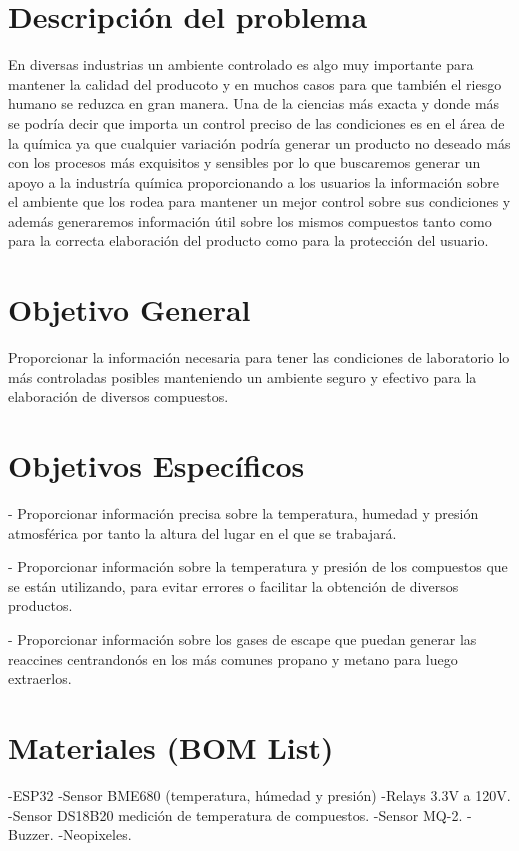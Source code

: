 \documentclass[10pt,twocolumn,letterpaper]{article}
\begin{document}
\begin{Abstract}
\section{Descripción del problema}
En diversas industrias un ambiente controlado es algo muy importante para mantener la calidad del producoto y en muchos casos para que también el riesgo humano se reduzca en gran manera. Una de la ciencias más exacta y donde más se podría decir que importa un control preciso de las condiciones es en el área de la química ya que cualquier variación podría generar un producto no deseado más con los procesos más exquisitos y sensibles por lo que buscaremos generar un apoyo a la industría química proporcionando a los usuarios la información sobre el ambiente que los rodea para mantener un mejor control sobre sus condiciones y además generaremos información útil sobre los mismos compuestos tanto como para la correcta elaboración del producto como para la protección del usuario. 

\section{Objetivo General}
Proporcionar la información necesaria para tener las condiciones de laboratorio lo más controladas posibles manteniendo un ambiente seguro y efectivo para la elaboración de diversos compuestos.

\section{Objetivos Específicos}
    - Proporcionar información precisa sobre la temperatura, humedad y presión atmosférica por tanto la altura del lugar en el que se trabajará. 

    - Proporcionar información sobre la temperatura y presión de los compuestos que se están utilizando, para evitar errores o facilitar la obtención de diversos productos.

    - Proporcionar información sobre los gases de escape que puedan generar las reaccines centrandonós en los más comunes propano y metano para luego extraerlos.


\section{Materiales (BOM List)}
-ESP32
-Sensor BME680 (temperatura, húmedad y presión)
-Relays 3.3V a 120V.
-Sensor DS18B20 medición de temperatura de compuestos.
-Sensor MQ-2.
-Buzzer.
-Neopixeles.


\end{Abstract}
\end{document}
